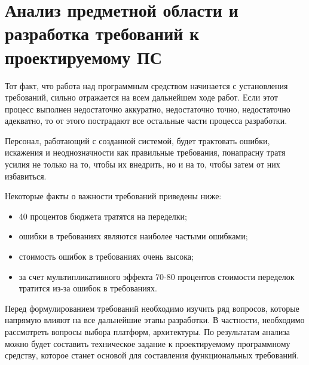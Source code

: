 \section{Анализ предметной области и разработка требований к проектируемому ПС}
\label{sec:analysis}

Тот факт, что работа над программным средством начинается с установления требований, сильно отражается на всем дальнейшем ходе работ. Если этот процесс выполнен недостаточно аккуратно, недостаточно точно, недостаточно адекватно, то от этого пострадают все остальные части процесса разработки.

Персонал, работающий с созданной системой, будет трактовать ошибки, искажения и неоднозначности как правильные требования, понапрасну тратя усилия не только на то, чтобы их внедрить, но и на то, чтобы затем от них избавиться.

Некоторые факты о важности требований приведены ниже:
\begin{itemize}
	\item 40 процентов бюджета тратятся на переделки;
	\item ошибки в требованиях являются наиболее частыми ошибками;
	\item стоимость ошибок в требованиях очень высока;
	\item за счет мультипликативного эффекта 70-80 процентов стоимости переделок тратится из-за ошибок в требованиях.
\end{itemize}

Перед формулированием требований необходимо изучить ряд вопросов, которые напрямую влияют на все дальнейшие этапы разработки. В частности, необходимо рассмотреть вопросы выбора платформ, архитектуры. По результатам анализа можно будет составить техническое задание к проектируемому программному средству, которое станет основой для составления функциональных требований.





